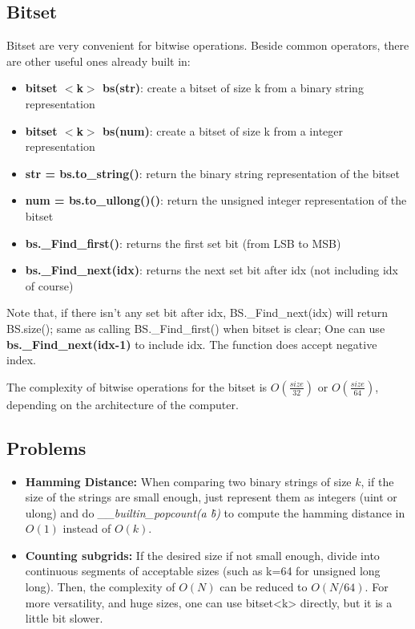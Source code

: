     \subsection{Bitset}

    Bitset are very convenient for bitwise operations. Beside common operators, there are other useful ones already built in:
    
    \begin{itemize} 
        \item \textbf{bitset $<$k$>$ bs(str)}: create a bitset of size k from a binary string representation
        \item \textbf{bitset $<$k$>$ bs(num)}: create a bitset of size k from a integer representation
        \item \textbf{str = bs.to\_string()}: return the binary string representation of the bitset
        \item \textbf{num = bs.to\_ullong()()}: return the unsigned integer representation of the bitset
        \item \textbf{bs.\_Find\_first()}: returns the first set bit (from LSB to MSB)
        \item \textbf{bs.\_Find\_next(idx)}: returns the next set bit after idx (not including idx of course)
    \end{itemize}

    Note that, if there isn't any set bit after idx, BS.\_Find\_next(idx) will return BS.size(); 
    same as calling BS.\_Find\_first() when bitset is clear;
    One can use \textbf{bs.\_Find\_next(idx-1)} to include idx. The function does accept negative index. 

    The complexity of bitwise operations for the bitset is $O(\frac{size}{32})$ or $O(\frac{size}{64})$, 
    depending on the architecture of the computer.
    
    \subsection{Problems}
    
    \begin{itemize}
        \item \textbf{Hamming Distance:} When comparing two binary strings of size $k$, if the size of the strings are small enough, 
        just represent them as integers (uint or ulong) and do \textit{\_\_builtin\_popcount(a \^ b)} to compute the hamming distance in $O(1)$ instead of $O(k)$.

        \item \textbf{Counting subgrids:} If the desired size if not small enough, divide into continuous segments of acceptable sizes (such as k=64 for unsigned long long).
        Then, the complexity of $O(N)$ can be reduced to $O(N/64)$. For more versatility, and huge sizes, one can use bitset<k> directly, but it is a little bit slower.

    \end{itemize}